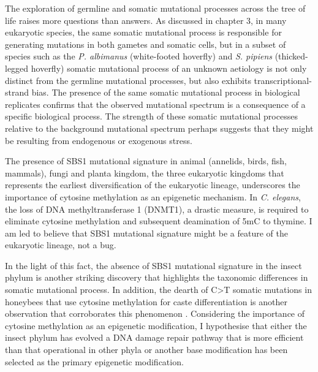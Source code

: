 The exploration of germline and somatic mutational processes across the tree of life raises more questions than answers. As discussed in chapter 3, in many eukaryotic species, the same somatic mutational process is responsible for generating mutations in both gametes and somatic cells, but in a subset of species such as the \textit{P. albimanus} (white-footed hoverfly) and \textit{S. pipiens} (thicked-legged hoverfly) somatic mutational process of an unknown aetiology is not only distinct from the germline mutational processes, but also exhibits transcriptional-strand bias. The presence of the same somatic mutational process in biological replicates confirms that the observed mutational spectrum is a consequence of a specific biological process. The strength of these somatic mutational processes relative to the background mutational spectrum perhaps suggests that they might be resulting from endogenous or exogenous stress. 

The presence of SBS1 mutational signature in animal (annelids, birds, fish, mammals), fungi and planta kingdom, the three eukaryotic kingdoms that represents the earliest diversification of the eukaryotic lineage, underscores the importance of cytosine methylation as an epigenetic mechanism. In \textit{C. elegans}, the loss of DNA methyltransferase 1 (DNMT1), a drastic measure, is required to eliminate cytosine methylation and subsequent deamination of 5mC to thymine. I am led to believe that SBS1 mutational signature might be a feature of the eukaryotic lineage, not a bug.

In the light of this fact, the absence of SBS1 mutational signature in the insect phylum is another striking discovery that highlights the taxonomic differences in somatic mutational process. In addition, the dearth of C>T somatic mutations in honeybees that use cytosine methylation for caste differentiation is another observation that corroborates this phenomenon \cite{Luo2000-zf}. Considering the importance of cytosine methylation as an epigenetic modification, I hypothesise that either the insect phylum has evolved a DNA damage repair pathway that is more efficient than that operational in other phyla or another base modification has been selected as the primary epigenetic modification. 

